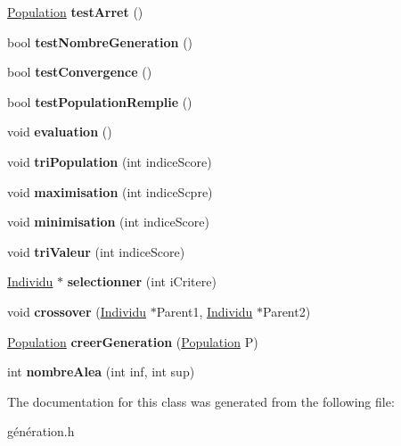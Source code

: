 \begin{DoxyCompactItemize}
\hyperlink{class_population}{Population} {\bfseries test\+Arret} ()
\item 
\mbox{\label{class_population_a9192297f35ab0c6c6078ae087b3e4aee}} 
bool {\bfseries test\+Nombre\+Generation} ()
\item 
\mbox{\label{class_population_ae3511322c007fc85a8dd9bda0693b9cf}} 
bool {\bfseries test\+Convergence} ()
\item 
\mbox{\label{class_population_a70cec52ba5d29e0f4a1a67a4ae52b276}} 
bool {\bfseries test\+Population\+Remplie} ()
\item 
\mbox{\label{class_population_a023ecf9c1f66140c8b42b4e2bc9755a9}} 
void {\bfseries evaluation} ()
\item 
\mbox{\label{class_population_a15c4b45d033b6af3765f5e86ce43f232}} 
void {\bfseries tri\+Population} (int indice\+Score)
\item 
\mbox{\label{class_population_ae240b80ad4eae0f1b2ec5ec1edcd88c3}} 
void {\bfseries maximisation} (int indice\+Scpre)
\item 
\mbox{\label{class_population_a6f27e76b6b15668b343c43c56027515d}} 
void {\bfseries minimisation} (int indice\+Score)
\item 
\mbox{\label{class_population_a4b167d07f145a1f1ea69b2bb4cfd2cfb}} 
void {\bfseries tri\+Valeur} (int indice\+Score)
\item 
\mbox{\label{class_population_a8d2410b15ebc9235d480241ed19ded2e}} 
\hyperlink{class_individu}{Individu} $\ast$ {\bfseries selectionner} (int i\+Critere)
\item 
\mbox{\label{class_population_a728129af67cfe97c0fa16d0728101a28}} 
void {\bfseries crossover} (\hyperlink{class_individu}{Individu} $\ast$Parent1, \hyperlink{class_individu}{Individu} $\ast$Parent2)
\item 
\mbox{\label{class_population_aad435f717d1f0f792b3a8d6a01f6d0a8}} 
\hyperlink{class_population}{Population} {\bfseries creer\+Generation} (\hyperlink{class_population}{Population} P)
\item 
\mbox{\label{class_population_a0bacc7dadc8ab903261ff053344a9e36}} 
int {\bfseries nombre\+Alea} (int inf, int sup)
\end{DoxyCompactItemize}


The documentation for this class was generated from the following file\+:\begin{DoxyCompactItemize}
\item 
génération.\+h\end{DoxyCompactItemize}
